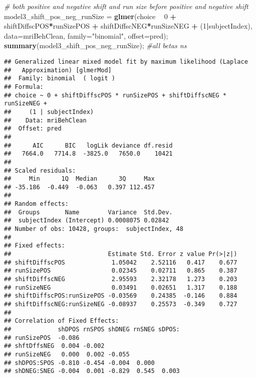 \documentclass[]{article}
\newenvironment{Shaded}{\begin{snugshade}}{\end{snugshade}}
\newcommand{\CommentTok}[1]{\textcolor[rgb]{0.56,0.35,0.01}{\textit{#1}}}
\newcommand{\DataTypeTok}[1]{\textcolor[rgb]{0.13,0.29,0.53}{#1}}
\newcommand{\DecValTok}[1]{\textcolor[rgb]{0.00,0.00,0.81}{#1}}
\newcommand{\KeywordTok}[1]{\textcolor[rgb]{0.13,0.29,0.53}{\textbf{#1}}}
\newcommand{\NormalTok}[1]{#1}
\newcommand{\OperatorTok}[1]{\textcolor[rgb]{0.81,0.36,0.00}{\textbf{#1}}}
\newcommand{\StringTok}[1]{\textcolor[rgb]{0.31,0.60,0.02}{#1}}
\begin{document}
\begin{Shaded}
\begin{Highlighting}[]
\CommentTok{# both positive and negative shift and run size before positive and negative shift}
\NormalTok{model3_shift_pos_neg_runSize =}\StringTok{ }\KeywordTok{glmer}\NormalTok{(choice }\OperatorTok{~}\StringTok{ }\DecValTok{0} \OperatorTok{+}\StringTok{ }\NormalTok{shiftDiffscPOS}\OperatorTok{*}\NormalTok{runSizePOS }\OperatorTok{+}\StringTok{ }\NormalTok{shiftDiffscNEG}\OperatorTok{*}\NormalTok{runSizeNEG }\OperatorTok{+}\StringTok{ }\NormalTok{(}\DecValTok{1}\OperatorTok{|}\NormalTok{subjectIndex), }\DataTypeTok{data=}\NormalTok{mriBehClean, }\DataTypeTok{family=}\StringTok{"binomial"}\NormalTok{, }\DataTypeTok{offset=}\NormalTok{pred);}
\KeywordTok{summary}\NormalTok{(model3_shift_pos_neg_runSize); }\CommentTok{#all betas ns}
\end{Highlighting}
\end{Shaded}

\begin{verbatim}
## Generalized linear mixed model fit by maximum likelihood (Laplace
##   Approximation) [glmerMod]
##  Family: binomial  ( logit )
## Formula: 
## choice ~ 0 + shiftDiffscPOS * runSizePOS + shiftDiffscNEG * runSizeNEG +  
##     (1 | subjectIndex)
##    Data: mriBehClean
##  Offset: pred
## 
##      AIC      BIC   logLik deviance df.resid 
##   7664.0   7714.8  -3825.0   7650.0    10421 
## 
## Scaled residuals: 
##     Min      1Q  Median      3Q     Max 
## -35.186  -0.449  -0.063   0.397 112.457 
## 
## Random effects:
##  Groups       Name        Variance  Std.Dev.
##  subjectIndex (Intercept) 0.0008075 0.02842 
## Number of obs: 10428, groups:  subjectIndex, 48
## 
## Fixed effects:
##                           Estimate Std. Error z value Pr(>|z|)
## shiftDiffscPOS             1.05042    2.52116   0.417    0.677
## runSizePOS                 0.02345    0.02711   0.865    0.387
## shiftDiffscNEG             2.95593    2.32178   1.273    0.203
## runSizeNEG                 0.03491    0.02651   1.317    0.188
## shiftDiffscPOS:runSizePOS -0.03569    0.24385  -0.146    0.884
## shiftDiffscNEG:runSizeNEG -0.08937    0.25573  -0.349    0.727
## 
## Correlation of Fixed Effects:
##             shDPOS rnSPOS shDNEG rnSNEG sDPOS:
## runSizePOS  -0.086                            
## shftDffsNEG  0.004 -0.002                     
## runSizeNEG   0.000  0.002 -0.055              
## shDPOS:SPOS -0.810 -0.454 -0.004  0.000       
## shDNEG:SNEG -0.004  0.001 -0.829  0.545  0.003
\end{verbatim}
\end{document}
